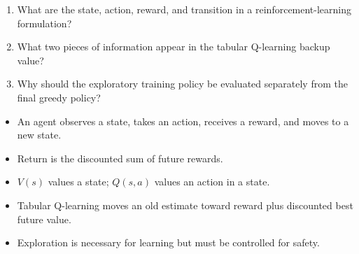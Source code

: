 

\begin{quickcheck}
\begin{enumerate}
  \item What are the state, action, reward, and transition in a reinforcement-learning formulation?
  \item What two pieces of information appear in the tabular Q-learning backup value?
  \item Why should the exploratory training policy be evaluated separately from the final greedy policy?
\end{enumerate}
\end{quickcheck}

\begin{chapterrecap}
\begin{itemize}
  \item An agent observes a state, takes an action, receives a reward, and moves to a new state.
  \item Return is the discounted sum of future rewards.
  \item $V(s)$ values a state; $Q(s,a)$ values an action in a state.
  \item Tabular Q-learning moves an old estimate toward reward plus discounted best future value.
  \item Exploration is necessary for learning but must be controlled for safety.
\end{itemize}
\end{chapterrecap}
